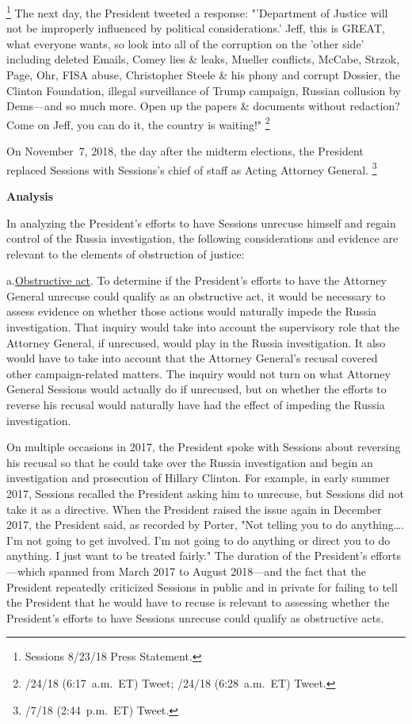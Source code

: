 \footnote{Sessions 8/23/18 Press Statement.}
The next day, the President tweeted a response: "'Department of Justice will not be improperly influenced by political considerations.'
Jeff, this is GREAT, what everyone wants, so look into all of the corruption on the 'other side' including deleted Emails, Comey lies \& leaks, Mueller conflicts, McCabe, Strzok, Page, Ohr, FISA abuse, Christopher Steele \& his phony and corrupt Dossier, the Clinton Foundation, illegal surveillance of Trump campaign, Russian collusion by Dems---and so much more.
Open up the papers \& documents without redaction? Come on Jeff, you can do it, the country is waiting!"%
\footnote{/24/18 (6:17~a.m.~ET) Tweet;
/24/18 (6:28~a.m.~ET) Tweet.}

On November~7, 2018, the day after the midterm elections, the President replaced Sessions with Sessions's chief of staff as Acting Attorney General.%
\footnote{/7/18 (2:44~p.m.~ET) Tweet.}

\begin{center}
\textbf{Analysis}
\end{center}

In analyzing the President's efforts to have Sessions unrecuse himself and regain control of the Russia investigation, the following considerations and evidence are relevant to the elements of obstruction of justice:

a.\qquad\underline{Obstructive act}.
To determine if the President's efforts to have the Attorney General unrecuse could qualify as an obstructive act, it would be necessary to assess evidence on whether those actions would naturally impede the Russia investigation.
That inquiry would take into account the supervisory role that the Attorney General, if unrecused, would play in the Russia investigation.
It also would have to take into account that the Attorney General's recusal covered other campaign-related matters.
The inquiry would not turn on what Attorney General Sessions would actually do if unrecused, but on whether the efforts to reverse his recusal would naturally have had the effect of impeding the Russia investigation.

On multiple occasions in 2017, the President spoke with Sessions about reversing his recusal so that he could take over the Russia investigation and begin an investigation and prosecution of Hillary Clinton.
For example, in early summer 2017, Sessions recalled the President asking him to unrecuse, but Sessions did not take it as a directive.
When the President raised the issue again in December 2017, the President said, as recorded by Porter, "Not telling you to do anything\dots.
I'm not going to get involved.
I'm not going to do anything or direct you to do anything.
I just want to be treated fairly."
The duration of the President's efforts---which spanned from March 2017 to August 2018---and the fact that the President repeatedly criticized Sessions in public and in private for failing to tell the President that he would have to recuse is relevant to assessing whether the President's efforts to have Sessions unrecuse could qualify as obstructive acts.

